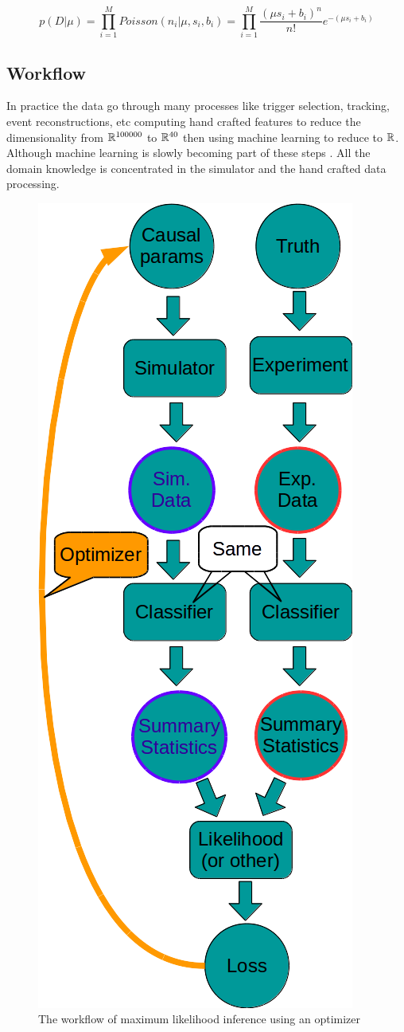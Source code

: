 \begin{equation}
	p(D|\mu) = \prod_{i=1}^M Poisson(n_i | \mu, s_i, b_i) = \prod_{i=1}^M \frac{(\mu s_i + b_i)^n }{n!} e^{-(\mu s_i + b_i)}
\end{equation}







\subsection{Workflow} %
\label{sub:workflow}


In practice the data go through many processes like trigger selection, tracking, event reconstructions, etc computing hand crafted features to reduce the dimensionality from $\mathbb{R}^{100 000}$ to $\mathbb{R}^{40}$ then using machine learning to reduce to $\mathbb{R}$.
Although machine learning is slowly becoming part of these steps \needcite.
All the domain knowledge is concentrated in the simulator and the hand crafted data processing.


\begin{figure}[htb]
    \centering
    \includegraphics[width=0.3\linewidth]{workflow}
    \caption{The workflow of maximum likelihood inference using an optimizer}
    \label{fig:workflow}
\end{figure}











